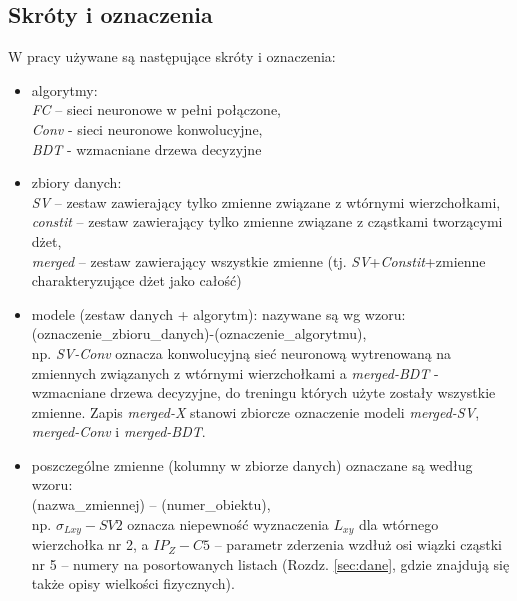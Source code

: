 \begin{appendices}
\section{Skróty i oznaczenia}
\label{sec:app:skroty}
W pracy używane są następujące skróty i oznaczenia: 
\begin{itemize}
	\item algorytmy: \\ \textit{FC} -- sieci neuronowe w pełni połączone,\\ \textit{Conv} - sieci neuronowe konwolucyjne,\\ \textit{BDT} - wzmacniane drzewa decyzyjne
	\item zbiory danych: \\ \textit{SV} -- zestaw zawierający tylko zmienne związane z wtórnymi wierzchołkami,\\ \textit{constit} -- zestaw zawierający tylko zmienne związane z cząstkami tworzącymi dżet,\\ \textit{merged} -- zestaw zawierający wszystkie zmienne (tj. \textit{SV}+\textit{Constit}+zmienne charakteryzujące dżet jako całość)
	\item modele (zestaw danych + algorytm): nazywane są wg wzoru: \\ (oznaczenie\_zbioru\_danych)-(oznaczenie\_algorytmu), \\np. \textit{SV-Conv} oznacza konwolucyjną sieć neuronową wytrenowaną na zmiennych związanych z wtórnymi wierzchołkami a \textit{merged-BDT} - wzmacniane drzewa decyzyjne, do treningu których użyte zostały wszystkie zmienne. Zapis \textit{merged-X} stanowi zbiorcze oznaczenie modeli \textit{merged-SV}, \textit{merged-Conv} i \textit{merged-BDT}.
	\item poszczególne zmienne (kolumny w zbiorze danych) oznaczane są według wzoru: \\ (nazwa\_zmiennej) -- (numer\_obiektu), \\np. $\sigma_{Lxy} - SV2$ oznacza niepewność wyznaczenia $L_{xy}$ dla wtórnego wierzchołka nr 2, a $IP_Z - C5$ -- parametr zderzenia wzdłuż osi wiązki cząstki nr 5 -- numery na posortowanych listach (Rozdz. \ref{sec:dane}, gdzie znajdują się także opisy wielkości fizycznych).
\end{itemize} 


\end{appendices}
